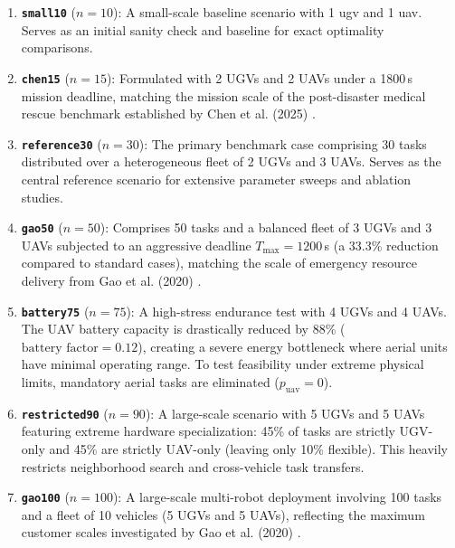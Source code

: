 \begin{enumerate}
    \item \textbf{\texttt{small10}} ($n=10$): A small-scale baseline scenario with 1 \ac{ugv} and 1 \ac{uav}. Serves as an initial sanity check and baseline for exact optimality comparisons.
    \item \textbf{\texttt{chen15}} ($n=15$): Formulated with 2 UGVs and 2 UAVs under a 1800\,s mission deadline, matching the mission scale of the post-disaster medical rescue benchmark established by Chen et al. (2025) \cite{chen}.
    \item \textbf{\texttt{reference30}} ($n=30$): The primary benchmark case comprising 30 tasks distributed over a heterogeneous fleet of 2 UGVs and 3 UAVs. Serves as the central reference scenario for extensive parameter sweeps and ablation studies.
    \item \textbf{\texttt{gao50}} ($n=50$): Comprises 50 tasks and a balanced fleet of 3 UGVs and 3 UAVs subjected to an aggressive deadline $T_{\max} = 1200$\,s (a 33.3\% reduction compared to standard cases), matching the scale of emergency resource delivery from Gao et al. (2020) \cite{gao}.
    \item \textbf{\texttt{battery75}} ($n=75$): A high-stress endurance test with 4 UGVs and 4 UAVs. The UAV battery capacity is drastically reduced by 88\% ($\text{battery factor} = 0.12$), creating a severe energy bottleneck where aerial units have minimal operating range. To test feasibility under extreme physical limits, mandatory aerial tasks are eliminated ($p_{\text{uav}} = 0$).
    \item \textbf{\texttt{restricted90}} ($n=90$): A large-scale scenario with 5 UGVs and 5 UAVs featuring extreme hardware specialization: 45\% of tasks are strictly UGV-only and 45\% are strictly UAV-only (leaving only 10\% flexible). This heavily restricts neighborhood search and cross-vehicle task transfers.
    \item \textbf{\texttt{gao100}} ($n=100$): A large-scale multi-robot deployment involving 100 tasks and a fleet of 10 vehicles (5 UGVs and 5 UAVs), reflecting the maximum customer scales investigated by Gao et al. (2020) \cite{gao}.
\end{enumerate}

